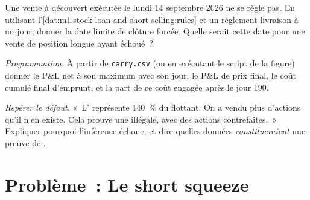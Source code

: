 \begin{exercise}[$\star\star$]\label{exo:m1:stock-loan-and-short-selling:6}
Une vente à découvert exécutée le lundi 14 septembre 2026 ne se règle pas. En utilisant
l'\cref{dat:m1:stock-loan-and-short-selling:rules} et un règlement-livraison à un jour,
donner la date limite de clôture forcée. Quelle serait cette date pour une vente de position
longue ayant échoué~?
\end{exercise}

\begin{exercise}[$\star\star\star$]\label{exo:m1:stock-loan-and-short-selling:7}
\emph{Programmation.} À partir de \texttt{carry.csv} (ou en exécutant le script de la figure)
donner le P\&L net à son maximum avec son jour, le P\&L de prix final, le
coût cumulé final d'emprunt, et la part de ce coût engagée après le jour
190.
\end{exercise}

\begin{exercise}[$\star\star\star$]\label{exo:m1:stock-loan-and-short-selling:8}
\emph{Repérer le défaut.} «~L' représente 140~\% du flottant. On a vendu plus
d'actions qu'il n'en existe. Cela prouve une  illégale, avec des
actions contrefaites.~» Expliquer pourquoi l'inférence échoue, et dire quelles données \emph{constitueraient}
une preuve de .
\end{exercise}

\section{Problème~: Le short squeeze}

